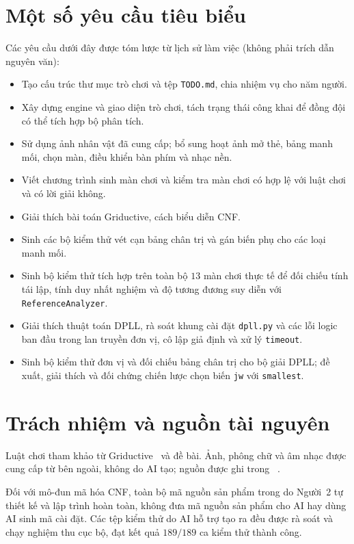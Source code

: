 \section{Một số yêu cầu tiêu biểu}
Các yêu cầu dưới đây được tóm lược từ lịch sử làm việc (không phải trích dẫn nguyên văn):
\begin{itemize}
    \item Tạo cấu trúc thư mục trò chơi và tệp \texttt{TODO.md}, chia nhiệm vụ cho năm người.
    \item Xây dựng engine và giao diện trò chơi, tách trạng thái công khai để đồng đội có thể tích hợp bộ phân tích.
    \item Sử dụng ảnh nhân vật đã cung cấp; bổ sung hoạt ảnh mở thẻ, bảng manh mối, chọn màn, điều khiển bàn phím và nhạc nền.
    \item Viết chương trình sinh màn chơi và kiểm tra màn chơi có hợp lệ với luật chơi và có lời giải không.
    \item Giải thích bài toán Griductive, cách biểu diễn CNF.
    \item Sinh các bộ kiểm thử vét cạn bảng chân trị và gán biến phụ cho các loại manh mối.
    \item Sinh bộ kiểm thử tích hợp trên toàn bộ $13$ màn chơi thực tế để đối chiếu tính tái lập, tính duy nhất nghiệm và độ tương đương suy diễn với \texttt{ReferenceAnalyzer}.
    \item Giải thích thuật toán DPLL, rà soát khung cài đặt \texttt{dpll.py} và các lỗi logic ban đầu trong lan truyền đơn vị, cô lập giả định và xử lý \texttt{timeout}.
    \item Sinh bộ kiểm thử đơn vị và đối chiếu bảng chân trị cho bộ giải DPLL; đề xuất, giải thích và đối chứng chiến lược chọn biến \texttt{jw} với \texttt{smallest}.
\end{itemize}

\section{Trách nhiệm và nguồn tài nguyên}
Luật chơi tham khảo từ Griductive~\cite{griductive} và đề bài. Ảnh, phông chữ và âm nhạc được cung cấp từ bên ngoài, không do AI tạo; nguồn được ghi trong ~\cite{assetRecord}.

Đối với mô-đun mã hóa CNF, toàn bộ mã nguồn sản phẩm trong  do Người~2 tự thiết kế và lập trình hoàn toàn, không đưa mã nguồn sản phẩm cho AI hay dùng AI sinh mã cài đặt. Các tệp kiểm thử do AI hỗ trợ tạo ra đều được rà soát và chạy nghiệm thu cục bộ, đạt kết quả $189/189$ ca kiểm thử thành công.

